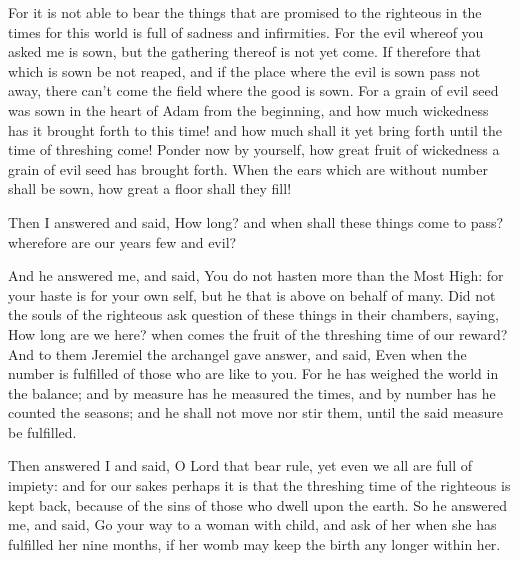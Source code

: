 {For it is not able to bear the things that are promised to the righteous in the times
{} for this world is full of sadness and infirmities.
For the evil
 whereof you asked me is sown, but the gathering thereof is not yet come.
If therefore that which is sown be not reaped, and if the place where the evil is sown pass not away, there can’t come the field where the good is sown.
For a grain of evil seed was sown in the heart of Adam from the beginning, and how much wickedness has it brought forth to this time! and how much shall it yet bring forth until the
 time of threshing come!
Ponder now by yourself, how great fruit of wickedness a grain of evil seed has brought forth.
When the ears which are without number shall be sown, how great a floor shall they fill!
\par }{\PP {}Then I answered and said,
 How long? and when shall these things come to pass? wherefore are our years few and evil?
\par }{\PP {}And he answered me, and said, You do not hasten more than the Most High: for your haste is
 for your own self, but he that is above
{} on behalf of many.
Did not the souls of the righteous ask question of these things in their chambers, saying, How long
 are we here? when comes the fruit of the
 threshing time of our reward?
And to them Jeremiel the archangel gave answer, and said, Even when the number is fulfilled of those who are like to you. For he has weighed the world in the balance;
and by measure has he measured the times, and by number has he counted the seasons; and he shall not
 move nor stir them, until the said measure be fulfilled.
\par }{\PP {}Then answered I and said, O Lord that bear rule, yet even we all are full of impiety:
and for our sakes perhaps it is that the
 threshing time of the righteous is kept back, because of the sins of those who dwell upon the earth.
So he answered me, and said, Go your way to a woman with child, and ask of her when she has fulfilled her nine months, if her womb may keep the birth any longer within her.
}
